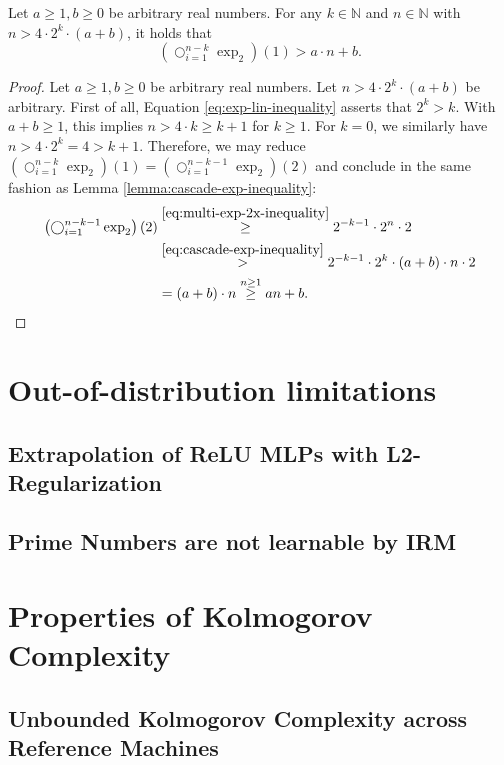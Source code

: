 \begin{corollary}
	\label{cor:cascade-exp-inequality-basis}
	Let $a\geq 1,b\geq 0$ be arbitrary real numbers.
	For any $k\in\mathbb{N}$ and $n\in\mathbb{N}$ with $n>4\cdot 2^k\cdot (a+b)$, it holds that
	\begin{equation}
		\left(\bigcirc_{i=1}^{n-k}\exp_2\right)(1) > a\cdot n + b.
	\end{equation}
\end{corollary}
\begin{proof}
	Let $a\geq 1,b\geq 0$ be arbitrary real numbers.
	Let $n>4\cdot 2^k \cdot (a+b)$ be arbitrary. 
	First of all, Equation \ref{eq:exp-lin-inequality} asserts that $2^k>k$.
	With $a+b\geq 1$, this implies $n>4\cdot k\geq k+1$ for $k\geq 1$.
	For $k=0$, we similarly have $n>4\cdot 2^k=4>k+1$.
	Therefore, we may reduce $\left(\bigcirc_{i=1}^{n-k}\exp_2\right)(1)=\left(\bigcirc_{i=1}^{n-k-1}\exp_2\right)(2)$ and conclude in the same fashion as Lemma \ref{lemma:cascade-exp-inequality}:
	\begin{align}
		\left(\bigcirc_{i=1}^{n-k-1}\exp_2\right)(2) &\overset{\ref{eq:multi-exp-2x-inequality}}{\geq} 2^{-k-1}\cdot 2^n \cdot 2\\
		&\overset{\ref{eq:cascade-exp-inequality}}{>} 2^{-k-1} \cdot 2^k\cdot (a+b)\cdot n \cdot 2\\
		& = (a+b)\cdot n \overset{n\geq 1}{\geq} an+b.
	\end{align}
\end{proof}

\section{Out-of-distribution limitations}
\subsection{Extrapolation of ReLU MLPs with L2-Regularization}
\subsection{Prime Numbers are not learnable by IRM}
\section{Properties of Kolmogorov Complexity}
\subsection{Unbounded Kolmogorov Complexity across Reference Machines}
